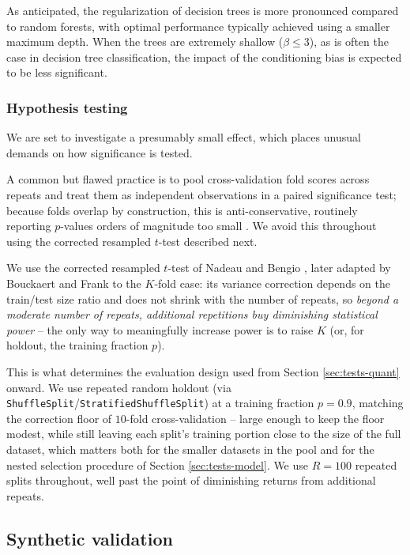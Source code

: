 \documentclass[5p,twocolumn,authoryear]{elsarticle}
\theoremstyle{plain}%
\theoremstyle{remark}%
\theoremstyle{definition}%
\begin{document}
As anticipated, the regularization of decision trees is more pronounced compared to random forests, with optimal performance typically achieved using a smaller maximum depth. When the trees are extremely shallow ($\beta \leq 3$), as is often the case in decision tree classification, the impact of the conditioning bias is expected to be less significant.


\subsubsection{Hypothesis testing}
\label{sec:tests-testing}

We are set to investigate a presumably small effect, which places unusual demands on how significance is tested.

A common but flawed practice is to pool cross-validation fold scores across repeats and treat them as independent observations in a paired significance test; because folds overlap by construction, this is anti-conservative, routinely reporting $p$-values orders of magnitude too small \citep{dietterich1998, nadeau2003, bengio2004}. We avoid this throughout using the corrected resampled $t$-test described next.

We use the corrected resampled $t$-test of Nadeau and Bengio \citeyearpar{nadeau2003}, later adapted by Bouckaert and Frank \citeyearpar{bouckaert2004} to the $K$-fold case: its variance correction depends on the train/test size ratio and does not shrink with the number of repeats, so \emph{beyond a moderate number of repeats, additional repetitions buy diminishing statistical power} -- the only way to meaningfully increase power is to raise $K$ (or, for holdout, the training fraction $p$).

This is what determines the evaluation design used from Section \ref{sec:tests-quant} onward. We use repeated random holdout (via \texttt{ShuffleSplit}/\texttt{StratifiedShuffleSplit}) at a training fraction $p=0.9$, matching the correction floor of $10$-fold cross-validation -- large enough to keep the floor modest, while still leaving each split's training portion close to the size of the full dataset, which matters both for the smaller datasets in the pool and for the nested selection procedure of Section \ref{sec:tests-model}. We use $R=100$ repeated splits throughout, well past the point of diminishing returns from additional repeats.

\subsection{Synthetic validation}
\label{sec:synthetic}
\end{document}
